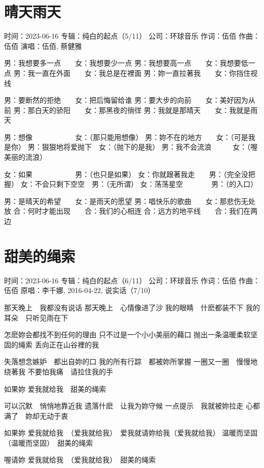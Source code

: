 \documentclass[UTF8,a4paper,oneside,twocolumn,12pt]{ctexbook}
\newcommand{\infopair}[2]{\textbullet #1：#2}
\newcommand{\zc}[1][伍佰]{\infopair{作词}{#1}}
\newcommand{\zq}[1][伍佰]{\infopair{作曲}{#1}}
\newcommand{\zj}[1]{\infopair{专辑}{#1}}
\newcommand{\yc}[1]{\infopair{原唱}{#1}}
\newcommand{\sj}[1]{\infopair{时间}{#1}}
\newcommand{\gs}[1]{\infopair{公司}{#1}}
\newenvironment{info}{\begin{flushleft}\kaishu
	}
	{\end{flushleft}\normalsize\yahei\par}
\newenvironment{lyric}{
	}
{}
\begin{document}
\section{晴天雨天}
\begin{info}
	\sj{2023-06-16}
	\zj{纯白的起点（5/11）}
	\gs{环球音乐}
	\zc
	\zq
	\infopair{演唱}{伍佰, 蔡健雅}
\end{info}
\begin{lyric}
	男：我想要多一点　　女：我想要少一点
	男：我想要高一点　　女：我想要低一点
	男：我一直在外面　　女：我总是在裡面
	男：妳一直拉著我　　女：你挡住视线

	男：要断然的拒绝　　女：把后悔留给谁
	男：要大步的向前　　女：美好因为从前
	男：那白天的骄阳　　女：那黑夜的徜徉
	男：我就是那晴天　　女：我就是雨天

	男：想像　　　　　　女：（那只能用想像）
	男：妳不在的地方　　女：（可是我是你）
	男：狠狠地将爱抛下　女：（抛下的是我）
	男：我不会流浪　　　女：（喔美丽的流浪）

	女：如果　　　　　　男：（也只是如果）
	女：你就跟著我走　　男：（完全没把握）
	女：不会只剩下空空　男：（无所谓）
	女：荡荡星空　　　　男：（的入口）

	男：是晴天的希望　　女：是雨天的愿望
	男：唱快乐的歌曲　　女：那悲伤无处放
	合：何时才能出现　　合：我们的心相连
	合：远方的地平线　　合：我们在两边
\end{lyric}

\section{甜美的绳索}
\begin{info}
	\sj{2023-06-16}
	\zj{纯白的起点（6/11）}
	\gs{环球音乐}
	\zc
	\zq
	\yc{李千娜, 2016-04-22, 说实话（7/10）}
\end{info}
\begin{lyric}
	那天晚上　我都没有说话
	那天晚上　心情像进了沙
	我的眼睛　什麽都装不下
	我的耳朵　只听见雨在下

	怎麽妳会都找不到任何的理由
	只不过是一个小小美丽的藉口
	抛出一条温暖柔软坚固的绳索
	丢向正在山谷裡的我

	失落想念嫉妒　都出自妳的口
	我的所有行踪　都被妳所掌握
	一圈又一圈　慢慢地绕著我
	不要怕我痛　请拉住我的手

	如果妳
	爱我就给我　甜美的绳索

	可以沉默　悄悄地靠近我
	遗落什麽　让我为妳守候
	一点提示　我就被妳拉走
	心都满了　妳却无动于衷

	如果妳
	爱我就给我　（爱我就给我）　爱我就请妳给我（爱我就给我）
	温暖而坚固　（温暖而坚固）　甜美的绳索

	喔请妳
	爱我就给我　（爱我就给我）　甜美的绳索
\end{lyric}
\end{document}

